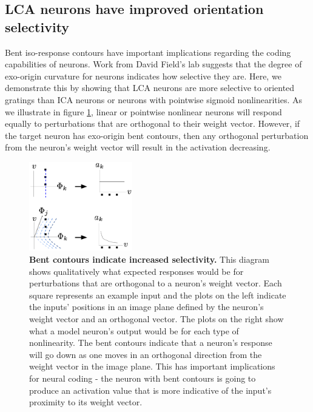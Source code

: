 \subsection{LCA neurons have improved orientation selectivity}
Bent iso-response contours have important implications regarding the coding capabilities of neurons.
Work from David Field's lab \parencite{golden2016conjectures, vilankar2017selectivity} suggests that the degree of exo-origin curvature for neurons indicates how selective they are.
Here, we demonstrate this by showing that LCA neurons are more selective to oriented gratings than ICA neurons or neurons with pointwise sigmoid nonlinearities.
As we illustrate in figure \ref{fig:ch4_lca_selectivity_diagram}, linear or pointwise nonlinear neurons will respond equally to perturbations that are orthogonal to their weight vector.
However, if the target neuron has exo-origin bent contours, then any orthogonal perturbation from the neuron's weight vector will result in the activation decreasing.

\begin{figure}[h]
    \centering
    \includegraphics[width=0.4\textwidth]{figures/lca_selectivity_diagram.png}
    \caption{\textbf{Bent contours indicate increased selectivity.} This diagram shows qualitatively what expected responses would be for perturbations that are orthogonal to a neuron's weight vector. Each square represents an example input and the plots on the left indicate the inputs' positions in an image plane defined by the neuron's weight vector and an orthogonal vector. The plots on the right show what a model neuron's output would be for each type of nonlinearity. The bent contours indicate that a neuron's response will go down as one moves in an orthogonal direction from the weight vector in the image plane. This has important implications for neural coding - the neuron with bent contours is going to produce an activation value that is more indicative of the input's proximity to its weight vector.}
    \label{fig:ch4_lca_selectivity_diagram}
\end{figure}

